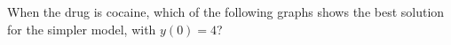 \documentclass{ximera}
\begin{document}
\begin{question}
When the drug is cocaine, which of the following graphs shows the best solution for the simpler model, with $y(0)=4$?
\begin{multipleChoice}
\end{multipleChoice}


\end{question}
\end{document}
